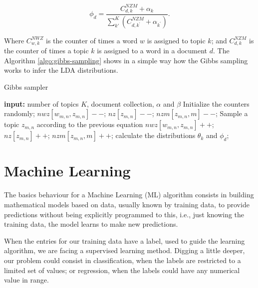 	\begin{equation}
		\label{eq:phi-dist}
		\phi_{d} = \frac{C_{d,k}^{NZM} + \alpha_{k}} {\sum_{k'}^{K} \left(C_{d,k^{'}}^{NZM} + \alpha_{k^{'}} \right)} \text{.}
	\end{equation}
	
	Where $C_{w,k}^{NWZ}$ is the counter of times a word $w$ is assigned to topic $k$; and $C_{d,k}^{NZM}$ is the counter of times a topic $k$ is assigned to a word in a document $d$. The Algorithm \ref{algo:gibbs-sampling} shows in a simple way how the Gibbs sampling works to infer the LDA distributions.
	
	\begin{algorithm}[h!]
		\caption{Gibbs sampler} 
		\label{algo:gibbs-sampling}
		\begin{algorithmic}[1]
			\State \textbf{input:} number of topics $K$, document collection, $\alpha$ and $\beta$
			\Begin
			\State Initialize the counters randomly;
			\State $nwz[w_{m,n}, z_{m,n}]--$; $nz[z_{m,n}]--$; $nzm[z_{m,n},m]--$;
			\State Sample a topic $z_{m,n}$ according to the previous equation
			\State $nwz[w_{m,n}, z_{m,n}]++$; $nz[z_{m,n}]++$; $nzm[z_{m,n},m]++$;
			\EndFor
			\EndFor
			\State calculate the distributions $\theta_{k}$ and $\phi_{d}$;
			\EndIf
			\EndWhile
			\End
		\end{algorithmic} 
	\end{algorithm}
	

\section{Machine Learning}
	
	The basics behaviour for a Machine Learning (ML) algorithm consists in building mathematical models based on data, usually known by training data, to provide predictions without being explicitly programmed to this, i.e., just knowing the training data, the model learns to make new predictions. 
	
	When the entries for our training data have a label, used to guide the learning algorithm, we are facing a supervised learning method. Digging a little deeper, our problem could consist in classification, when the labels are restricted to a limited set of values; or regression, when the labels could have any numerical value in range. 
		
